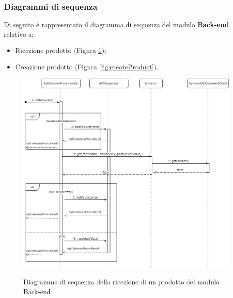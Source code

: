 \subsubsection{Diagrammi di sequenza}
Di seguito è rappresentato il diagramma di sequenza del modulo \textbf{Back-end} relativo a:
\begin{itemize}
	\item Ricezione prodotto (Figura \ref{fig:getProduct});
	\item Creazione prodotto (Figura \ref{fig:createProduct}).
\end{itemize}

\vspace{1cm}

\begin{figure}[H]
\centering
\includegraphics[scale=0.43]{res/Architettura/Backend/img/diagrammaSequenzaRicezioneProdotto.png}\\
\caption{Diagramma di sequenza della ricezione di un prodotto del modulo Back-end}
\label{fig:getProduct}
\end{figure}

\vspace{1cm}


